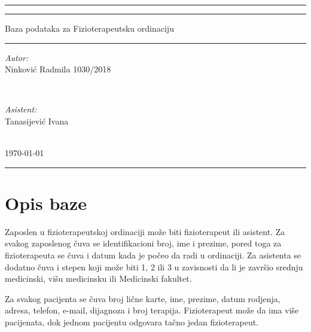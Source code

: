 \documentclass{article}
\begin{document}
	
\begin{titlepage} 
	\centering 
	
	\rule{\textwidth}{1pt}
	
	\vspace{2pt}\vspace{-\baselineskip} 
	
	\rule{\textwidth}{0.4pt}
	
	\vspace{0.025\textheight}

	{\Huge Baza podataka za Fizioterapeutsku ordinaciju}
	
	\vspace{0.020\textheight}
	
	\rule{0.5\textwidth}{1pt}
	
	\vspace{0.5\textheight}
	
	\begin{minipage}{0.4\textwidth}
		\begin{flushleft} \large
			\emph{Autor:}\\
			Ninković Radmila 1030/2018
		\end{flushleft}
	\end{minipage}
	~
	\begin{minipage}{0.4\textwidth}
		\begin{flushright} \large
			\emph{Asistent:} \\
			Tanasijević Ivana
		\end{flushright}
	\end{minipage}\\[2cm]

	{\large \today}\\[2cm]
	
	\rule{1\textwidth}{1.5pt}
	
\end{titlepage}

\newpage
\section{Opis baze}

Zaposlen u fizioterapeutskoj ordinaciji može biti fizioterapeut ili asistent. Za svakog zaposlenog čuva se identifikacioni broj, ime i prezime, pored toga za fizioterapeuta se čuva i datum kada je počeo da radi u ordinaciji. Za asistenta se dodatno čuva i stepen koji može biti 1, 2 ili 3 u zavisnosti da li je završio srednju medicinski, višu medicinsku ili Medicinski fakultet.

Za svakog pacijenta se čuva broj lične karte, ime, prezime, datum rodjenja, adresa, telefon, e-mail, dijagnoza i broj terapija. Fizioterapeut može da ima više pacijenata, dok jednom pacijentu odgovara tačno jedan fizioterapeut.
\end{document}
